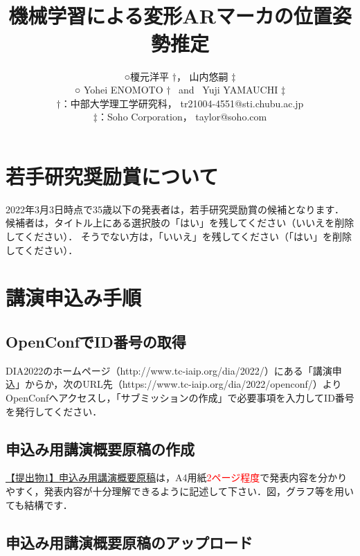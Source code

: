 \documentclass[a4j,twocolumn,10pt]{jarticle}
\title{
\vspace{15mm}
\Large{
\textbf{\leftline{【若手研究奨励賞候補：はい】}}\\
\textbf{機械学習による変形ARマーカの位置姿勢推定}} %
}
\author{
\vspace{1.5em}
\large{○榎元洋平 $\dagger$，} %
\large{山内悠嗣 $\ddagger$}\\                 %
\vspace{1em}
\large{{\rm ○ Yohei ENOMOTO $\dagger$\ }             %
{\rm and\ }
{\rm Yuji YAMAUCHI $\ddagger$} }\\     %
\vspace{0.5em}
\large{$\dagger$：中部大学理工学研究科，}     %
{\rm tr21004-4551@sti.chubu.ac.jp} \\                    %
\large{$\ddagger$：Soho Corporation，}    %
{\rm taylor@soho.com }\\                     %
}
\date{} %
\begin{document}
\vspace{1em}

\section{若手研究奨励賞について}
2022年3月3日時点で35歳以下の発表者は，若手研究奨励賞の候補となります．
候補者は，タイトル上にある選択肢の「はい」を残してください（いいえを削除してください）．
そうでない方は，「いいえ」を残してください（「はい」を削除してください）．

\section{講演申込み手順}

\subsection{OpenConfでID番号の取得}

DIA2022のホームページ（http://www.tc-iaip.org/dia/2022/）にある「講演申込」からか，次のURL先（https://www.tc-iaip.org/dia/2022/openconf/）よりOpenConfへアクセスし，「サブミッションの作成」で必要事項を入力してID番号を発行してください．

\subsection{申込み用講演概要原稿の作成}

\underline{【提出物1】申込み用講演概要原稿}は，A4用紙\textcolor{red}{2ページ程度}で発表内容を分かりやすく，発表内容が十分理解できるように記述して下さい．図，グラフ等を用いても結構です．

\subsection{申込み用講演概要原稿のアップロード}
\end{document}
